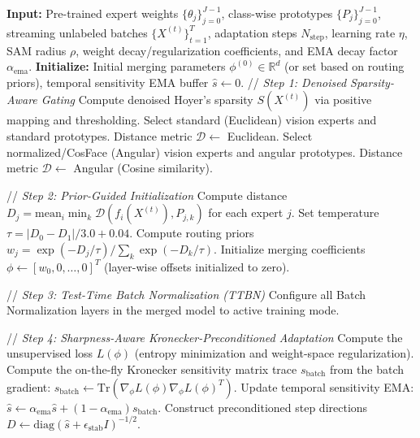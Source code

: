 \documentclass{article}
\theoremstyle{plain}
\theoremstyle{definition}
\theoremstyle{remark}
\begin{document}
\begin{algorithm}[H]
\caption{SAK-AHR: Test-Time Model Merging with Sharpness-Aware Kronecker Preconditioning}
\label{alg:sakahr}
\begin{algorithmic}[1]
\STATE \textbf{Input:} Pre-trained expert weights $\{\theta_j\}_{j=0}^{J-1}$, class-wise prototypes $\{P_j\}_{j=0}^{J-1}$, streaming unlabeled batches $\{X^{(t)}\}_{t=1}^T$, adaptation steps $N_{\text{step}}$, learning rate $\eta$, SAM radius $\rho$, weight decay/regularization coefficients, and EMA decay factor $\alpha_{\text{ema}}$.
\STATE \textbf{Initialize:} Initial merging parameters $\phi^{(0)} \in \mathbb{R}^d$ (or set based on routing priors), temporal sensitivity EMA buffer $\hat{s} \gets 0$.
    \STATE // \textit{Step 1: Denoised Sparsity-Aware Gating}
    \STATE Compute denoised Hoyer's sparsity $S(X^{(t)})$ via positive mapping and thresholding.
        \STATE Select standard (Euclidean) vision experts and standard prototypes.
        \STATE Distance metric $\mathcal{D} \gets$ Euclidean.
    \ELSE
        \STATE Select normalized/CosFace (Angular) vision experts and angular prototypes.
        \STATE Distance metric $\mathcal{D} \gets$ Angular (Cosine similarity).
    \ENDIF
    
    \STATE // \textit{Step 2: Prior-Guided Initialization}
    \STATE Compute distance $D_j = \text{mean}_i \min_k \mathcal{D}(f_i(X^{(t)}), P_{j,k})$ for each expert $j$.
    \STATE Set temperature $\tau = |D_0 - D_1| / 3.0 + 0.04$.
    \STATE Compute routing priors $w_j = \exp(-D_j / \tau) / \sum_k \exp(-D_k / \tau)$.
    \STATE Initialize merging coefficients $\phi \gets [w_0, 0, \dots, 0]^T$ (layer-wise offsets initialized to zero).
    
    \STATE // \textit{Step 3: Test-Time Batch Normalization (TTBN)}
    \STATE Configure all Batch Normalization layers in the merged model to active training mode.
    
    \STATE // \textit{Step 4: Sharpness-Aware Kronecker-Preconditioned Adaptation}
        \STATE Compute the unsupervised loss $L(\phi)$ (entropy minimization and weight-space regularization).
        \STATE Compute the on-the-fly Kronecker sensitivity matrix trace $s_{\text{batch}}$ from the batch gradient:
        \STATE $s_{\text{batch}} \gets \text{Tr}(\nabla_\phi L(\phi) \nabla_\phi L(\phi)^T)$.
        \STATE Update temporal sensitivity EMA: $\hat{s} \gets \alpha_{\text{ema}} \hat{s} + (1 - \alpha_{\text{ema}}) s_{\text{batch}}$.
        \STATE Construct preconditioned step directions $D \gets \text{diag}(\hat{s} + \epsilon_{\text{stab}} I)^{-1/2}$.
        

\end{algorithmic}
\end{algorithm}
\end{document}
